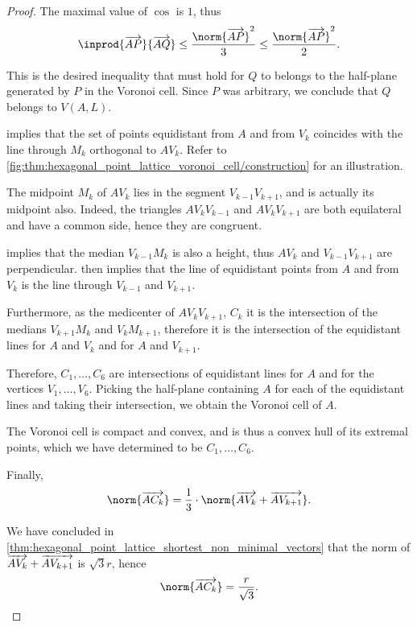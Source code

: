 \begin{proof}
  The maximal value of \( \cos \) is \( 1 \), thus
  \begin{equation*}
    \inprod {\vect{AP}} {\vect{AQ}} \leq \frac {\norm{\vect{AP}}^2} 3 \leq \frac {\norm{\vect{AP}}^2} 2.
  \end{equation*}

  This is the desired inequality that must hold for \( Q \) to belongs to the half-plane generated by \( P \) in the Voronoi cell. Since \( P \) was arbitrary, we conclude that \( Q \) belongs to \( V(A, L) \).

    implies that the set of points equidistant from \( A \) and from \( V_k \) coincides with the line through \( M_k \) orthogonal to \( A V_k \). Refer to \cref{fig:thm:hexagonal_point_lattice_voronoi_cell/construction} for an illustration.

  The midpoint \( M_k \) of \( A V_k \) lies in the segment \( V_{k-1} V_{k+1} \), and is actually its midpoint also. Indeed, the triangles \( A V_k V_{k-1} \) and \( A V_k V_{k+1} \) are both equilateral and have a common side, hence they are congruent.

   implies that the median \( V_{k-1} M_k \) is also a height, thus \( AV_k \) and \( V_{k-1} V_{k+1} \) are perpendicular.  then implies that the line of equidistant points from \( A \) and from \( V_k \) is the line through \( V_{k-1} \) and \( V_{k+1} \).

  Furthermore, as the medicenter of \( A V_k V_{k+1} \), \( C_k \) it is the intersection of the medians \( V_{k+1} M_k \) and \( V_k M_{k+1} \), therefore it is the intersection of the equidistant lines for \( A \) and \( V_k \) and for \( A \) and \( V_{k+1} \).

  Therefore, \( C_1, \ldots, C_6 \) are intersections of equidistant lines for \( A \) and for the vertices \( V_1, \ldots, V_6 \). Picking the half-plane containing \( A \) for each of the equidistant lines and taking their intersection, we obtain the Voronoi cell of \( A \).

  The Voronoi cell is compact and convex, and is thus a convex hull of its extremal points, which we have determined to be \( C_1, \ldots, C_6 \).

   Finally,
  \begin{equation*}
    \norm{\vect{AC_k}}
    =
    \frac 1 3 \cdot \norm{\vect{AV_k} + \vect{AV_{k+1}}}.
  \end{equation*}

  We have concluded in \cref{thm:hexagonal_point_lattice_shortest_non_minimal_vectors} that the norm of \( \overrightarrow{AV_k} + \overrightarrow{AV_{k+1}} \) is \( \sqrt 3 r \), hence
  \begin{equation*}
    \norm{\vect{AC_k}} = \frac r {\sqrt 3}.
  \end{equation*}
\end{proof}

